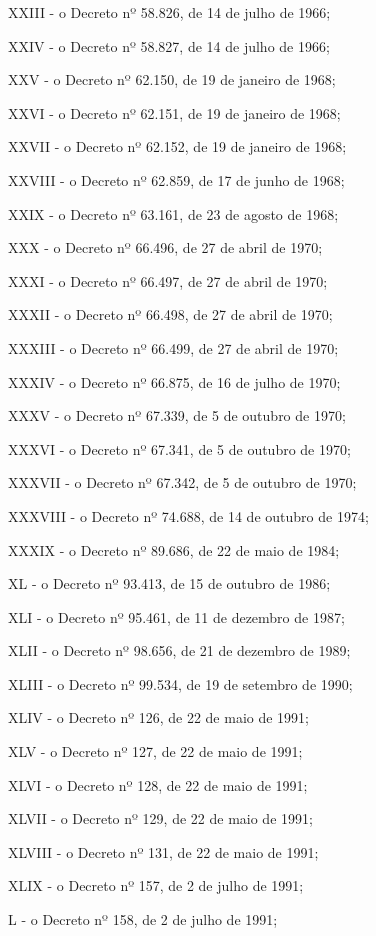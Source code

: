 \documentclass[
]{book}
\begin{document}
XXIII - o Decreto nº 58.826, de 14 de julho de 1966;

XXIV - o Decreto nº 58.827, de 14 de julho de 1966;

XXV - o Decreto nº 62.150, de 19 de janeiro de 1968;

XXVI - o Decreto nº 62.151, de 19 de janeiro de 1968;

XXVII - o Decreto nº 62.152, de 19 de janeiro de 1968;

XXVIII - o Decreto nº 62.859, de 17 de junho de 1968;

XXIX - o Decreto nº 63.161, de 23 de agosto de 1968;

XXX - o Decreto nº 66.496, de 27 de abril de 1970;

XXXI - o Decreto nº 66.497, de 27 de abril de 1970;

XXXII - o Decreto nº 66.498, de 27 de abril de 1970;

XXXIII - o Decreto nº 66.499, de 27 de abril de 1970;

XXXIV - o Decreto nº 66.875, de 16 de julho de 1970;

XXXV - o Decreto nº 67.339, de 5 de outubro de 1970;

XXXVI - o Decreto nº 67.341, de 5 de outubro de 1970;

XXXVII - o Decreto nº 67.342, de 5 de outubro de 1970;

XXXVIII - o Decreto nº 74.688, de 14 de outubro de 1974;

XXXIX - o Decreto nº 89.686, de 22 de maio de 1984;

XL - o Decreto nº 93.413, de 15 de outubro de 1986;

XLI - o Decreto nº 95.461, de 11 de dezembro de 1987;

XLII - o Decreto nº 98.656, de 21 de dezembro de 1989;

XLIII - o Decreto nº 99.534, de 19 de setembro de 1990;

XLIV - o Decreto nº 126, de 22 de maio de 1991;

XLV - o Decreto nº 127, de 22 de maio de 1991;

XLVI - o Decreto nº 128, de 22 de maio de 1991;

XLVII - o Decreto nº 129, de 22 de maio de 1991;

XLVIII - o Decreto nº 131, de 22 de maio de 1991;

XLIX - o Decreto nº 157, de 2 de julho de 1991;

L - o Decreto nº 158, de 2 de julho de 1991;
\end{document}
